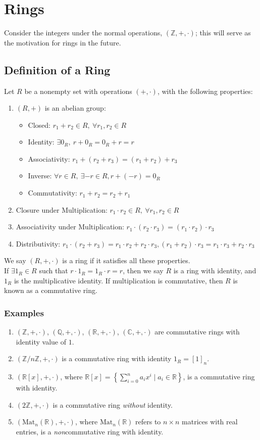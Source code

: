 \documentclass[8pt]{extarticle}
\newcommand{\Q}{\mathbb{Q}}
\newcommand{\Z}{\mathbb{Z}}
\newcommand{\R}{\mathbb{R}}
\begin{document}
  \section{Rings}%
  Consider the integers under the normal operations, $(\Z,+,\cdot)$; this will serve as the motivation for rings in the future.
  \subsection{Definition of a Ring}%
   Let $R$ be a nonempty set with operations $(+,\cdot)$, with the following properties:
    \begin{enumerate}[(1)]
      \item $(R,+)$ is an abelian group:
        \begin{itemize}
          \item Closed: $r_1 + r_2\in R,~ \forall r_1,r_2\in R$
          \item Identity: $\exists 0_R,~r + 0_R = 0_R+r = r$
          \item Associativity: $r_1 + (r_2 + r_3) = (r_1 + r_2) + r_3$
          \item Inverse: $\forall r\in R,~\exists -r\in R, r + (-r) = 0_R$
          \item Commutativity: $r_1 + r_2 = r_2 + r_1$
        \end{itemize}
      \item Closure under Multiplication: $r_1\cdot r_2\in R,~\forall r_1,r_2\in R$
      \item Associativity under Multiplication: $r_1\cdot (r_2 \cdot r_3) = (r_1\cdot r_2)\cdot r_3$
      \item Distributivity: $r_1\cdot (r_2 + r_3) = r_1\cdot r_2 + r_2\cdot r_3, (r_1 + r_2)\cdot r_3 = r_1\cdot r_3 + r_2\cdot r_3$
    \end{enumerate}
  We say $(R,+,\cdot)$ is a ring if it satisfies all these properties.\\

  If $\exists 1_R\in R$ such that $r\cdot 1_R = 1_R \cdot r = r$, then we say $R$ is a ring with identity, and $1_R$ is the multiplicative identity. If multiplication is commutative, then $R$ is known as a commutative ring.
  \subsubsection{Examples}%
  \begin{enumerate}[(1)]
    \item $(\Z,+,\cdot)$, $(\Q,+,\cdot)$, $(\R,+,\cdot)$, $(\mathbb{C},+,\cdot)$ are commutative rings with identity value of $1$.
    \item $(\Z/n\Z,+,\cdot)$ is a commutative ring with identity $1_{R} = [1]_n$.
    \item $(\R[x],+,\cdot)$, where $\displaystyle\R[x] = \left\{\sum_{i=0}^{n}a_ix^i\mid a_i\in\R\right\}$, is a commutative ring with identity.
    \item $(2\Z,+,\cdot)$ is a commutative ring \textit{without} identity.
    \item $(\text{Mat}_{n}(\R),+,\cdot)$, where $\text{Mat}_n(\R)$ refers to $n\times n$ matrices with real entries, is a \textit{non}commutative ring with identity.
  \end{enumerate}
\end{document}

